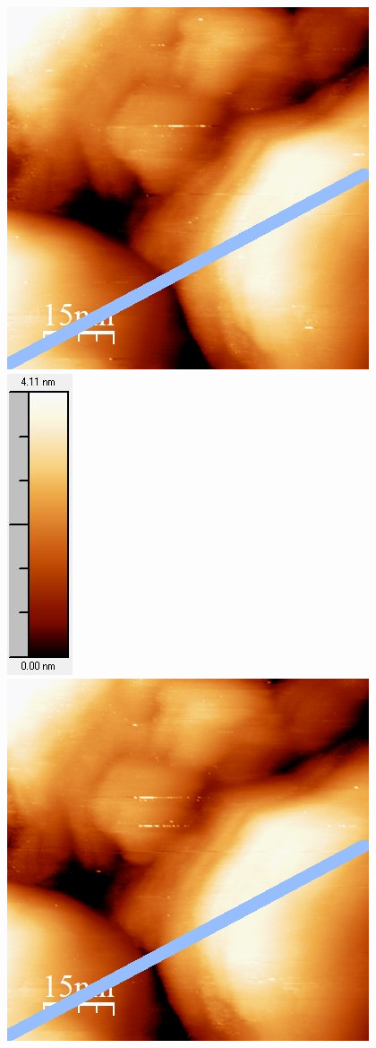 \documentclass[12pt,a4paper]{article}
\begin{document}
\begin{figure}
\centering
\includegraphics[scale=0.6]{Bilder/Anhang/Zeit/0_4_Zeit_vor.jpg}
\includegraphics[scale=0.6]{Bilder/Anhang/Zeit/0_4_Zeit_vor_Skala.jpg}
\includegraphics[scale=0.6]{Bilder/Anhang/Zeit/0_4_Zeit_nach.jpg}

\end{figure}
\end{document}
